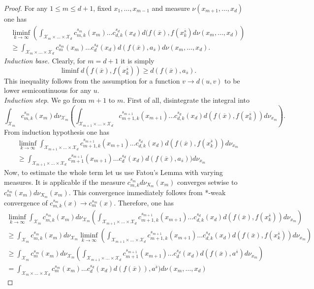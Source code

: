 \documentclass{amsart}
\theoremstyle{remark}
\numberwithin{equation}{section}
\numberwithin{figure}{section}
\def\mX{\mathcal{X}}
\def\v{\overline}
\begin{document}
\begin{proof}
For any $1 \leq m\leq d+1$, fixed $x_1, \ldots, x_{m-1}$ and measure $\nu(x_{m+1}, \ldots, x_d)$ one has
\begin{eqnarray*}
	\liminf_{k\to \infty} \left( \int_{\mX_{m}\times\ldots\times \mX_d} c_{{m}, k}^{s_{m}}(x_{m}) \ldots c_{d, k}^{s_d}(x_d) d(f(\v x), f(x_k^{\v s}) d\nu (x_{m}, \ldots, x_d) \right)
	\\ \geq \int_{\mX_{m}\times\ldots\times \mX_d} c_{m}^{s_{m}}(x_{m}) \ldots c_{d}^{s_d}(x_d) d(f(\v x), a_{\v s}) d\nu (x_{m}, \ldots, x_d). 
\end{eqnarray*}
\textit{Induction base.} Clearly, for $m = d+1$ it is simply
\[
\liminf d(f(\v x), f(x_k^{\v s})) \geq d(f(\v x), a_{\v s}).
\] 
This inequality follows from the assumption for a function $v \to d(u, v)$ to be lower semicontinuous for any $u$.
\\ \textit{Induction step}. We go from $m+1$ to $m$. First of all, disintegrate the integral into
	\[
	\int_{\mX_{m}} c_{m, k}^{s_m}(x_m) d\nu_{\mX_m}\left( \int_{\mX_{m+1}\times\ldots\times \mX_d} c_{m+1, k}^{s_{m+1}}(x_{m+1}) \ldots c_{d, k}^{s_d}(x_d) d(f(\v x), f(x_k^{\v s})) d\nu_{x_m}\right).
	\]
	From induction hypothesis one has
	\begin{eqnarray*}
	\liminf_{k\to \infty} \int_{\mX_{m+1}\times\ldots\times \mX_d} c_{m+1, k}^{s_{m+1}}(x_{m+1}) \ldots c_{d, k}^{s_d}(x_d) d(f(\v x), f(x_k^{\v s})) d\nu_{x_m}
	\\ \geq  \int_{\mX_{m+1}\times\ldots\times \mX_d} c_{m+1}^{s_{m+1}}(x_{m+1}) \ldots c_{d}^{s_d}(x_d) d(f(\v x), a_{\v s})) d\nu_{x_m}
	\end{eqnarray*}
	Now, to estimate the whole term let us use Fatou's Lemma with varying measures. It is applicable if the measure $c_{m, k}^{s_m} d\nu_{X_m}(x_m)$ converges setwise to $c_{m}^{s_m}(x_m) d\nu_{X_m}(x_{m})$. This convergence immediately follows from *-weak convergence of $c_{m, k}^{s_m} (x)\to c_m^{s_m}(x)$. Therefore, one has
	\begin{eqnarray*}
		\liminf_{k\to \infty} \int_{\mX_{m}} c_{m, k}^{s_m}(x_m) d\nu_{\mX_m}\left( \int_{\mX_{m+1}\times\ldots\times \mX_d} c_{m+1, k}^{s_{m+1}}(x_{m+1}) \ldots c_{d, k}^{s_d}(x_d) d(f(\v x), f(x_k^{\v s})) d\nu_{x_m}\right)
		\\ \geq \int_{\mX_{m}} c_{m, k}^{s_m}(x_m) d\nu_{\mX_m} \liminf_{k\to\infty} \left( \int_{\mX_{m+1}\times\ldots\times \mX_d} c_{m+1, k}^{s_{m+1}}(x_{m+1}) \ldots c_{d, k}^{s_d}(x_d) d(f(\v x), f(x_k^{\v s})) d\nu_{x_m}\right)
		\\ \geq \int_{\mX_{m}} c_{m}^{s_m}(x_m) d\nu_{\mX_m} \left( \int_{\mX_{m+1}\times\ldots\times \mX_d} c_{m+1}^{s_{m+1}}(x_{m+1}) \ldots c_{d}^{s_d}(x_d) d(f(\v x), a^{\v s}) d\nu_{x_m}\right)
		\\ = \int_{\mX_m \times \ldots \times \mX_{d}} c_m^{s_m}(x_m) \ldots c_d^{s_d}(x_d) d(f(\v x)), a^{\v s}) d\nu(x_m, \ldots, x_d)
	\end{eqnarray*}


\end{proof}
\end{document}
